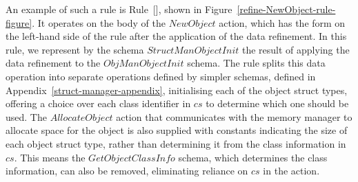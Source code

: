 An example of such a rule is Rule~[],
shown in Figure~\ref{refine-NewObject-rule-figure}.
It operates on the body of the $NewObject$ action, which has the form
on the left-hand side of the rule after the application of the data
refinement.
In this rule, we represent by the schema $StructManObjectInit$ the
result of applying the data refinement to the $ObjManObjectInit$
schema.
The rule splits this data operation into separate operations defined
by simpler schemas, defined in Appendix~\ref{struct-manager-appendix},
initialising each of the object struct types, offering a choice over
each class identifier in $cs$ to determine which one should be used.
The $AllocateObject$ action that communicates with the memory manager
to allocate space for the object is also supplied with constants
indicating the size of each object struct type, rather than
determining it from the class information in $cs$.
This means the $GetObjectClassInfo$ schema, which determines the class
information, can also be removed, eliminating reliance on $cs$ in the
action.

